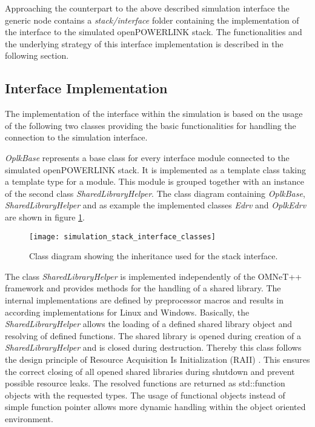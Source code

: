 Approaching the counterpart to the above described simulation interface the generic node contains a \emph{stack/interface} folder containing the implementation of the interface to the simulated openPOWERLINK stack.
The functionalities and the underlying strategy of this interface implementation is described in the following section.

\subsection{Interface Implementation}
\label{sec:porting_stack_interface}
The implementation of the interface within the simulation is based on the usage of the following two classes providing the basic functionalities for handling the connection to the simulation interface.

\emph{OplkBase} represents a base class for every interface module connected to the simulated openPOWERLINK stack.
It is implemented as a template class taking a template type for a module.
This module is grouped together with an instance of the second class \emph{SharedLibraryHelper}.
The class diagram containing \emph{OplkBase}, \emph{SharedLibraryHelper} and as example the implemented classes \emph{Edrv} and \emph{OplkEdrv} are shown in figure \ref{fig:simulation_stack_interface_classes}.

\begin{figure}
    \centering
    \texttt{[image: simulation\_stack\_interface\_classes]}
    \caption{Class diagram showing the inheritance used for the stack interface.}
    \label{fig:simulation_stack_interface_classes}
\end{figure}

\begin{sloppypar}
The class \emph{SharedLibraryHelper} is implemented independently of the OMNeT++ framework and provides methods for the handling of a shared library.
The internal implementations are defined by preprocessor macros and results in according implementations for Linux and Windows.
Basically, the \emph{SharedLibraryHelper} allows the loading of a defined shared library object and resolving of defined functions.
The shared library is opened during creation of a \emph{SharedLibraryHelper} and is closed during destruction.
Thereby this class follows the design principle of Resource Acquisition Is Initialization (RAII) \cite{cpp_raii}.
This ensures the correct closing of all opened shared libraries during shutdown and prevent possible resource leaks.
The resolved functions are returned as std::function objects with the requested types.
The usage of functional objects instead of simple function pointer allows more dynamic handling within the object oriented environment.
\end{sloppypar}

